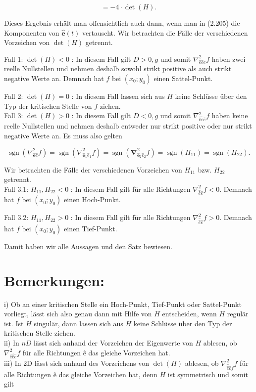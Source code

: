 \documentclass[10pt]{article}
\begin{document}
\begin{equation*}
=-4 \cdot \operatorname{det}(H) . \tag{2.208}
\end{equation*}


Dieses Ergebnis erhält man offensichtlich auch dann, wenn man in (2.205) die Komponenten von $\hat{\mathbf{e}}(t)$ vertauscht. Wir betrachten die Fälle der verschiedenen Vorzeichen von $\operatorname{det}(H)$ getrennt.

Fall 1: $\operatorname{det}(H)<0$ : In diesem Fall gilt $D>0, g$ und somit $\nabla_{\hat{e} \hat{e} e}^{2} f$ haben zwei reelle Nullstellen und nehmen deshalb sowohl strikt positive als auch strikt negative Werte an. Demnach hat $f$ bei $\left(x_{0} ; y_{0}\right)$ einen Sattel-Punkt.

Fall 2: $\operatorname{det}(H)=0$ : In diesem Fall lassen sich aus $H$ keine Schlüsse über den Typ der kritischen Stelle von $f$ ziehen.\\
Fall 3: $\operatorname{det}(H)>0$ : In diesem Fall gilt $D<0, g$ und somit $\nabla_{\hat{e ̂ e} \hat{e}}^{2} f$ haben keine reelle Nullstellen und nehmen deshalb entweder nur strikt positive oder nur strikt negative Werte an. Es muss also gelten


\begin{equation*}
\operatorname{sgn}\left(\nabla_{\hat{\mathbf{e}} \hat{e}}^{2} f\right)=\operatorname{sgn}\left(\nabla_{\hat{\mathbf{e}}_{1} \hat{e}_{1}}^{2} f\right)=\operatorname{sgn}\left(\boldsymbol{\nabla}_{\hat{\mathbf{e}}_{2} \hat{e}_{2}}^{2} f\right)=\operatorname{sgn}\left(H_{11}\right)=\operatorname{sgn}\left(H_{22}\right) . \tag{2.209}
\end{equation*}


Wir betrachten die Fälle der verschiedenen Vorzeichen von $H_{11}$ bzw. $H_{22}$ getrennt.\\
Fall 3.1: $H_{11}, H_{22}<0$ : In diesem Fall gilt für alle Richtungen $\nabla_{\hat{e ̂} \hat{e}}^{2} f<0$. Demnach hat $f$ bei $\left(x_{0} ; y_{0}\right)$ einen Hoch-Punkt.

Fall 3.2: $H_{11}, H_{22}>0$ : In diesem Fall gilt für alle Richtungen $\nabla_{\hat{\hat{e}} \hat{e}}^{2} f>0$. Demnach hat $f$ bei $\left(x_{0} ; y_{0}\right)$ einen Tief-Punkt.

Damit haben wir alle Aussagen und den Satz bewiesen.

\section*{Bemerkungen:}
i) Ob an einer kritischen Stelle ein Hoch-Punkt, Tief-Punkt oder Sattel-Punkt vorliegt, lässt sich also genau dann mit Hilfe von $H$ entscheiden, wenn $H$ regulär ist. Ist $H$ singulär, dann lassen sich aus $H$ keine Schlüsse über den Typ der kritischen Stelle ziehen.\\
ii) In $n D$ lässt sich anhand der Vorzeichen der Eigenwerte von $H$ ablesen, ob $\nabla_{\hat{e ̂ e ̂ e}}^{2} f$ für alle Richtungen ê das gleiche Vorzeichen hat.\\
iii) In 2D lässt sich anhand des Vorzeichens von $\operatorname{det}(H)$ ablesen, ob $\nabla_{\hat{\hat{e}} \hat{e} f}^{2} f$ für alle Richtungen ê das gleiche Vorzeichen hat, denn $H$ ist symmetrisch und somit gilt
\end{document}
